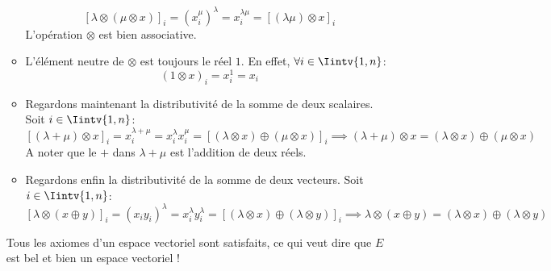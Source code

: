 \begin{exercice}
\begin{enumerate}
\begin{itemize}
        $$[\lambda \otimes (\mu \otimes x)]_i = (x_i ^ \mu) ^ \lambda = x_i ^{\lambda \mu} = [(\lambda \mu) \otimes x]_i$$
        L'opération $\otimes$ est bien associative.
        \item L'élément neutre de $\otimes$ est toujours le réel $1$. En effet, $\forall i \in \Iintv{1,n}$:
        $$(1 \otimes x)_i = x_i ^ 1 = x_i$$
        \item Regardons maintenant la distributivité de la somme de deux scalaires. Soit $i \in \Iintv{1,n}$:
        $$[(\lambda + \mu) \otimes x]_i = x_i ^{\lambda + \mu} = x_i^\lambda x_i^\mu = [(\lambda \otimes x) \oplus (\mu \otimes x)]_i \implies (\lambda + \mu) \otimes x = (\lambda \otimes x) \oplus (\mu \otimes x)$$
        A noter que le $+$ dans $\lambda + \mu$ est l'addition de deux réels.
        \item Regardons enfin la distributivité de la somme de deux vecteurs. Soit $i \in \Iintv{1,n}$:
        $$[\lambda \otimes (x \oplus y)]_i = (x_i y_i)^\lambda = x_i^\lambda y_i^\lambda = [(\lambda \otimes x) \oplus (\lambda \otimes y)]_i \implies \lambda \otimes (x \oplus y) = (\lambda \otimes x) \oplus (\lambda \otimes y)$$
    \end{itemize}
    Tous les axiomes d'un espace vectoriel sont satisfaits, ce qui veut dire que $E$ est bel et bien un espace vectoriel ! \\
\end{enumerate}
\end{exercice}

